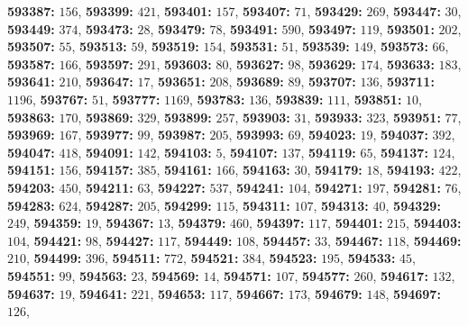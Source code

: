 \textsf{\bfseries 593387:} $156$, \textsf{\bfseries 593399:} $421$, \textsf{\bfseries 593401:} $157$, \textsf{\bfseries 593407:} $71$, \textsf{\bfseries 593429:} $269$, \textsf{\bfseries 593447:} $30$, \textsf{\bfseries 593449:} $374$, \textsf{\bfseries 593473:} $28$, \textsf{\bfseries 593479:} $78$, \textsf{\bfseries 593491:} $590$, \textsf{\bfseries 593497:} $119$, \textsf{\bfseries 593501:} $202$, \textsf{\bfseries 593507:} $55$, \textsf{\bfseries 593513:} $59$, \textsf{\bfseries 593519:} $154$, \textsf{\bfseries 593531:} $51$, \textsf{\bfseries 593539:} $149$, \textsf{\bfseries 593573:} $66$, \textsf{\bfseries 593587:} $166$, \textsf{\bfseries 593597:} $291$, \textsf{\bfseries 593603:} $80$, \textsf{\bfseries 593627:} $98$, \textsf{\bfseries 593629:} $174$, \textsf{\bfseries 593633:} $183$, \textsf{\bfseries 593641:} $210$, \textsf{\bfseries 593647:} $17$, \textsf{\bfseries 593651:} $208$, \textsf{\bfseries 593689:} $89$, \textsf{\bfseries 593707:} $136$, \textsf{\bfseries 593711:} $1196$, \textsf{\bfseries 593767:} $51$, \textsf{\bfseries 593777:} $1169$, \textsf{\bfseries 593783:} $136$, \textsf{\bfseries 593839:} $111$, \textsf{\bfseries 593851:} $10$, \textsf{\bfseries 593863:} $170$, \textsf{\bfseries 593869:} $329$, \textsf{\bfseries 593899:} $257$, \textsf{\bfseries 593903:} $31$, \textsf{\bfseries 593933:} $323$, \textsf{\bfseries 593951:} $77$, \textsf{\bfseries 593969:} $167$, \textsf{\bfseries 593977:} $99$, \textsf{\bfseries 593987:} $205$, \textsf{\bfseries 593993:} $69$, \textsf{\bfseries 594023:} $19$, \textsf{\bfseries 594037:} $392$, \textsf{\bfseries 594047:} $418$, \textsf{\bfseries 594091:} $142$, \textsf{\bfseries 594103:} $5$, \textsf{\bfseries 594107:} $137$, \textsf{\bfseries 594119:} $65$, \textsf{\bfseries 594137:} $124$, \textsf{\bfseries 594151:} $156$, \textsf{\bfseries 594157:} $385$, \textsf{\bfseries 594161:} $166$, \textsf{\bfseries 594163:} $30$, \textsf{\bfseries 594179:} $18$, \textsf{\bfseries 594193:} $422$, \textsf{\bfseries 594203:} $450$, \textsf{\bfseries 594211:} $63$, \textsf{\bfseries 594227:} $537$, \textsf{\bfseries 594241:} $104$, \textsf{\bfseries 594271:} $197$, \textsf{\bfseries 594281:} $76$, \textsf{\bfseries 594283:} $624$, \textsf{\bfseries 594287:} $205$, \textsf{\bfseries 594299:} $115$, \textsf{\bfseries 594311:} $107$, \textsf{\bfseries 594313:} $40$, \textsf{\bfseries 594329:} $249$, \textsf{\bfseries 594359:} $19$, \textsf{\bfseries 594367:} $13$, \textsf{\bfseries 594379:} $460$, \textsf{\bfseries 594397:} $117$, \textsf{\bfseries 594401:} $215$, \textsf{\bfseries 594403:} $104$, \textsf{\bfseries 594421:} $98$, \textsf{\bfseries 594427:} $117$, \textsf{\bfseries 594449:} $108$, \textsf{\bfseries 594457:} $33$, \textsf{\bfseries 594467:} $118$, \textsf{\bfseries 594469:} $210$, \textsf{\bfseries 594499:} $396$, \textsf{\bfseries 594511:} $772$, \textsf{\bfseries 594521:} $384$, \textsf{\bfseries 594523:} $195$, \textsf{\bfseries 594533:} $45$, \textsf{\bfseries 594551:} $99$, \textsf{\bfseries 594563:} $23$, \textsf{\bfseries 594569:} $14$, \textsf{\bfseries 594571:} $107$, \textsf{\bfseries 594577:} $260$, \textsf{\bfseries 594617:} $132$, \textsf{\bfseries 594637:} $19$, \textsf{\bfseries 594641:} $221$, \textsf{\bfseries 594653:} $117$, \textsf{\bfseries 594667:} $173$, \textsf{\bfseries 594679:} $148$, \textsf{\bfseries 594697:} $126$, 
